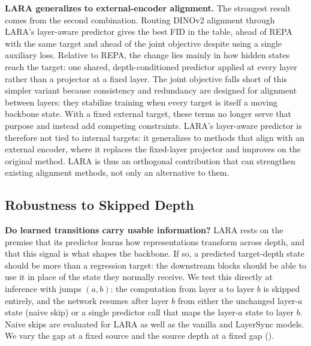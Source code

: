 \textbf{LARA generalizes to external-encoder alignment.} The strongest result comes from the second combination. Routing DINOv2 alignment through LARA's layer-aware predictor gives the best FID in the table, ahead of REPA with the same target and ahead of the joint objective despite using a single auxiliary loss. Relative to REPA, the change lies mainly in how hidden states reach the target: one shared, depth-conditioned predictor applied at every layer rather than a projector at a fixed layer. The joint objective falls short of this simpler variant because consistency and redundancy are designed for alignment between layers: they stabilize training when every target is itself a moving backbone state. With a fixed external target, these terms no longer serve that purpose and instead add competing constraints. LARA's layer-aware predictor is therefore not tied to internal targets: it generalizes to methods that align with an external encoder, where it replaces the fixed-layer projector and improves on the original method. LARA is thus an orthogonal contribution that can strengthen existing alignment methods, not only an alternative to them.

\subsection{Robustness to Skipped Depth}
\label{sec:inference_transition_diagnostic}

\textbf{Do learned transitions carry usable information?} LARA rests on the premise that its predictor learns how representations transform across depth, and that this signal is what shapes the backbone. If so, a predicted target-depth state should be more than a regression target: the downstream blocks should be able to use it in place of the state they normally receive. We test this directly at inference with jumps $(a,b)$: the computation from layer $a$ to layer $b$ is skipped entirely, and the network resumes after layer $b$ from either the unchanged layer-$a$ state (naive skip) or a single predictor call that maps the layer-$a$ state to layer $b$. Naive skips are evaluated for LARA as well as the vanilla and LayerSync models. We vary the gap at a fixed source and the source depth at a fixed gap ().

